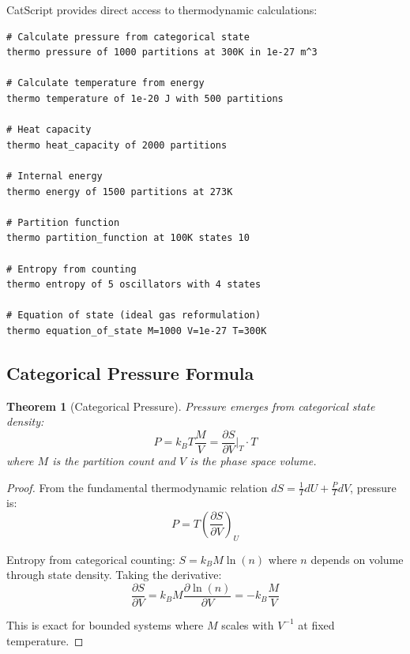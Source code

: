 \documentclass[twocolumn,10pt]{article}
\newtheorem{theorem}{Theorem}[section]
\begin{document}
CatScript provides direct access to thermodynamic calculations:

\begin{lstlisting}
# Calculate pressure from categorical state
thermo pressure of 1000 partitions at 300K in 1e-27 m^3

# Calculate temperature from energy
thermo temperature of 1e-20 J with 500 partitions

# Heat capacity
thermo heat_capacity of 2000 partitions

# Internal energy
thermo energy of 1500 partitions at 273K

# Partition function
thermo partition_function at 100K states 10

# Entropy from counting
thermo entropy of 5 oscillators with 4 states

# Equation of state (ideal gas reformulation)
thermo equation_of_state M=1000 V=1e-27 T=300K
\end{lstlisting}

\subsection{Categorical Pressure Formula}

\begin{theorem}[Categorical Pressure]
\label{thm:categorical_pressure}
Pressure emerges from categorical state density:
\begin{equation}
P = k_B T \frac{M}{V} = \frac{\partial S}{\partial V}\Big|_T \cdot T
\end{equation}
where $M$ is the partition count and $V$ is the phase space volume.
\end{theorem}

\begin{proof}
From the fundamental thermodynamic relation $dS = \frac{1}{T}dU + \frac{P}{T}dV$, pressure is:
\begin{equation}
P = T\left(\frac{\partial S}{\partial V}\right)_U
\end{equation}

Entropy from categorical counting: $S = k_B M \ln(n)$ where $n$ depends on volume through state density. Taking the derivative:
\begin{equation}
\frac{\partial S}{\partial V} = k_B M \frac{\partial \ln(n)}{\partial V} = -k_B \frac{M}{V}
\end{equation}

This is exact for bounded systems where $M$ scales with $V^{-1}$ at fixed temperature.
\end{proof}
\end{document}
